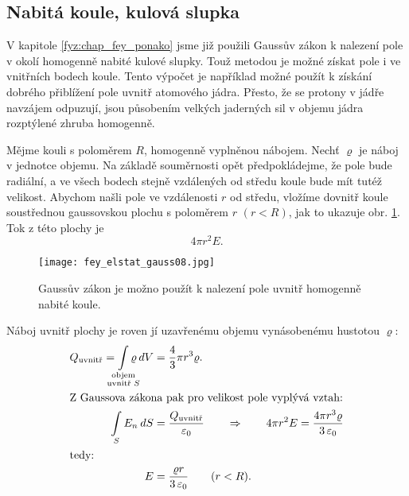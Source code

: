    \subsection{Nabitá koule, kulová slupka}
      V kapitole \ref{fyz:chap_fey_ponako} jsme již použili Gaussův zákon k nalezení pole v okolí homogenně 
      nabité kulové slupky. Touž metodou je možné získat pole i ve vnitřních bodech koule. Tento výpočet je 
      například možné použít k získání dobrého přiblížení pole uvnitř atomového jádra. Přesto, že se protony 
      v jádře navzájem odpuzují, jsou působením velkých jaderných sil v objemu jádra rozptýlené zhruba 
      homogenně.
      
      Mějme kouli s poloměrem \(R\), homogenně vyplněnou nábojem. Nechť \(\varrho\) je náboj v jednotce 
      objemu. Na základě souměrnosti opět předpokládejme, že pole bude radiální, a ve všech bodech stejně 
      vzdálených od středu koule bude mít tutéž velikost. Abychom našli pole ve vzdálenosti \(r\) od středu, 
      vložíme dovnitř koule soustřednou gaussovskou plochu s poloměrem \(r\) \((r< R)\), jak to ukazuje obr. 
      \ref{fyz:fig_fey_elstat_gauss08}. Tok z této plochy je \[4\pi r^2E.\]
      \begin{figure}[ht!] %
        \centering
        \texttt{[image: fey\_elstat\_gauss08.jpg]}
        \caption{Gaussův zákon je možno použít k nalezení pole uvnitř homogenně nabité koule.}
        \label{fyz:fig_fey_elstat_gauss08}
      \end{figure}
      Náboj uvnitř plochy je roven jí uzavřenému objemu vynásobenému hustotou \(\varrho\):
      \begin{align}
        Q_{\text{uvnitř}} 
                = \limitint_{\mathclap{\substack{\text{objem}\\
                                                 \text{uvnitř }S}}} \varrho\dd{V} 
          &= \frac{4}{3}\pi r^3\varrho.    \label{fyz:eq_fey_elstat_gauss05}    \\
       \shortintertext{Z Gaussova zákona pak pro velikost pole vyplývá vztah:}
       \limitint_S E_n\dd{S}
          &= \frac{Q_{\text{uvnitř}}}{\varepsilon_0} 
                \qquad\Rightarrow\qquad 4\pi r^2E 
                = \frac{4\pi r^3\varrho}{3\,\varepsilon_0}  \label{fyz:eq_fey_elstat_gauss06} \\ 
       \shortintertext{tedy:}
       E  &= \frac{\varrho r}{3\,\varepsilon_0} \qquad (r<R).
      \end{align}
      
